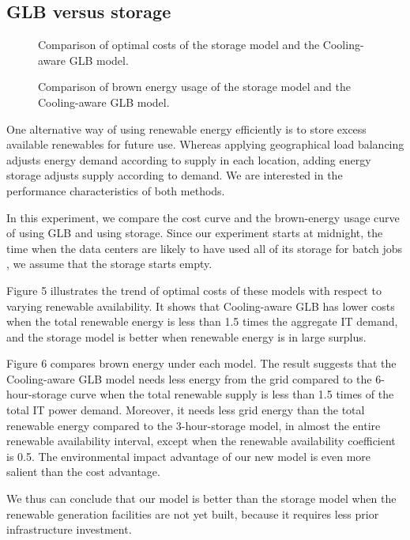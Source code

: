 \documentclass{acm_proc_article-sp}
\begin{document}
\subsection{GLB versus storage}

\begin{figure}
\centering
{}
\caption{Comparison of optimal costs of the storage model and the Cooling-aware GLB model.}
\end{figure}
\begin{figure}
\centering
{}
\caption{Comparison of brown energy usage of the storage model and the Cooling-aware GLB model.}
\end{figure}
One alternative way of using renewable energy efficiently is to store excess available renewables for future use. Whereas applying geographical load balancing adjusts energy demand according to supply in each location, adding energy storage adjusts supply according to demand. We are interested in the performance characteristics of both methods.

In this experiment, we compare the cost curve and the brown-energy usage curve of using GLB and using storage. Since our experiment starts at midnight, the time when the data centers are likely to have used all of its storage for batch jobs \cite{adam:cooling}, we assume that the storage starts empty.

Figure 5 illustrates the trend of optimal costs of these models with respect to varying renewable availability. It shows that Cooling-aware GLB has lower costs when the total renewable energy is less than 1.5 times the aggregate IT demand, and the storage model is better when renewable energy is in large surplus.

Figure 6 compares brown energy under each model. The result suggests that the Cooling-aware GLB model needs less energy from the grid compared to the 6-hour-storage curve when the total renewable supply is less than 1.5 times of the total IT power demand. Moreover, it needs less grid energy than the total renewable energy compared to the 3-hour-storage model, in almost the entire renewable availability interval, except when the renewable availability coefficient is 0.5. The environmental impact advantage of our new model is even more salient than the cost advantage.

We thus can conclude that our model is better than the storage model when the renewable generation facilities are not yet built, because it requires less prior infrastructure investment.
\end{document}
